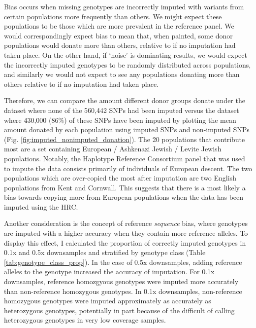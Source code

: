 {Bias occurs when missing genotypes are incorrectly imputed with variants from certain populations more frequently than others. We might expect these populations to be those which are more prevalent in the reference panel. We would correspondingly expect bias to mean that, when painted, some donor populations would donate more than others, relative to if no imputation had taken place. On the other hand, if `noise' is dominating results, we would expect the incorrectly imputed genotypes to be randomly distributed across populations, and similarly we would not expect to see any populations donating more than others relative to if no imputation had taken place. 

Therefore, we can compare the amount different donor groups donate under the dataset where none of the 560,442 SNPs had been imputed versus the dataset where 430,000 (86\%) of these SNPs have been imputed by plotting the mean amount donated by each population using imputed SNPs and non-imputed SNPs (Fig. \ref{fig:imputed_nonimputed_donation}). The 20 populations that contribute most are a set containing European / Ashkenazi Jewish / Levite Jewish populations. Notably, the Haplotype Reference Consortium panel that was used to impute the data consists primarily of individuals of European descent. The two populations which are over-copied the most after imputation are two English populations from Kent and Cornwall. This suggests that there is a most likely a bias towards copying more from European populations when the data has been imputed using the HRC. 

Another consideration is the concept of reference \textit{sequence} bias, where genotypes are imputed  with a higher accuracy when they contain more reference alleles. To display this effect, I calculated the proportion of correctly imputed genotypes in 0.1x and 0.5x downsamples and stratified by genotype class (Table \ref{tab:genotype_class_prop}). In the case of 0.5x downsamples, adding reference alleles to the genotype increased the accuracy of imputation. For 0.1x downsamples, reference homozgyous genotypes were imputed more accurately than non-reference homozygous genotypes. In 0.1x downsamples, non-reference homozygous genotypes were imputed approximately as accurately as heterozygous genotypes, potentially in part because of the difficult of calling heterozygous genotypes in very low coverage samples.

\begin{table}
\centering\begingroup\fontsize{10}{10}\selectfont


\end{table}}
